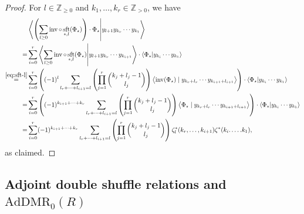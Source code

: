 \documentclass[15pt,oneside,reqno]{amsart}
\theoremstyle{remark}{
\newtheorem{lem}[df]{Lemma}
\newtheorem{prop}[df]{Proposition}
\newtheorem{ex}[df]{Example}
\newtheorem{rmk}[df]{Remark}
}
\newcommand{\AdDMR}{\mathrm{AdDMR}}
\DeclareMathOperator{\inv}{inv}
\DeclareMathOperator{\sft}{sft}
\begin{document}
\begin{proof}

For $l\in \mathbb{Z}_{\ge 0}$ and $k_1,\ldots,k_r \in \mathbb{Z}_{>0}$, we have
{\small
\begin{align*}
&\left\langle \left(\sum_{l\ge 0} \inv\circ \sft_{*,l} (\Phi_{\star}) \right)\cdot \Phi_{\star} \middle| y_{l+1}y_{k_r}\cdots y_{k_1}  \right\rangle\\
=&\sum_{i = 0}^r \left\langle \sum_{l\ge 0} \inv\circ \sft_{*,l} (\Phi_{\star}) \middle| y_{l+1}y_{k_r}\cdots y_{k_{i+1}}  \right\rangle \cdot \left\langle\Phi_{\star} \middle| y_{k_i}\cdots y_{k_{1}}  \right\rangle\\
\stackrel{\eqref{eq:sft-l}}{=}&\hspace{0cm}\sum_{i = 0}^r \left((-1)^l\sum_{l_r+\cdots +l_{i+1} = l} \left(\prod_{j = 1}^r \binom{k_j + l_j -1}{l_j} \right) \left\langle \inv(\Phi_{\star}) \mid y_{k_r+l_r}\cdots y_{k_{i+1} + l_{i+1}}  \right\rangle \right)\cdot \left\langle\Phi_{\star} \middle| y_{k_i}\cdots y_{k_{1}}  \right\rangle\\
=&\sum_{i = 0}^r \left((-1)^{k_{i+1}+ \cdots + k_r}\sum_{l_r+\cdots +l_{i+1} = l} \left(\prod_{j = 1}^r \binom{k_j + l_j -1}{l_j} \right) \left\langle \Phi_{\star} \mid y_{k_r+l_r}\cdots y_{k_{i+1} + l_{i+1}}  \right\rangle \right)\cdot \left\langle\Phi_{\star} \middle| y_{k_i}\cdots y_{k_{1}}  \right\rangle\\
=& \sum_{i = 0}^r (-1)^{k_{i+1}+ \cdots + k_r}\sum_{l_r+\cdots +l_{i+1} = l} \left(\prod_{j = 1}^r \binom{k_j + l_j -1}{l_j} \right) \zeta^*_l(k_r,\ldots,k_{i+1})\zeta^*(k_i.\ldots.k_1),
\end{align*}
}
as claimed.
\end{proof}


\subsection{Adjoint double shuffle relations and $\AdDMR_0(R)$}
\end{document}
